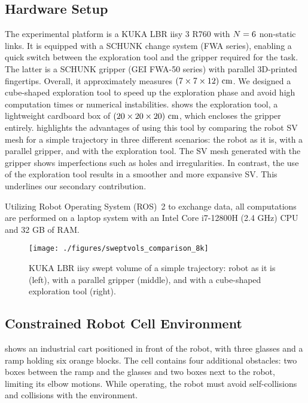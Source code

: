 \subsection{Hardware Setup}
The experimental platform is a KUKA LBR iisy 3 R760 with ${N}=6$ non-static links.
It is equipped with a SCHUNK change system (FWA series), 
enabling a quick switch between the exploration tool and the gripper required for the task.
The latter is a SCHUNK gripper (GEI FWA-50 series) with parallel 3D-printed fingertips.  Overall, it approximately measures ${\left( 7 \times 7 \times 12 \right)\,\text{cm}}$.
We designed a cube-shaped exploration tool to speed up the exploration phase 
and avoid high computation times or numerical instabilities. 
 shows the exploration tool, 
a lightweight cardboard box of ${\left( 20 \times 20 \times 20 \right)\,\text{cm}}$, which encloses the gripper entirely.
 highlights the advantages of using this tool
by comparing the robot SV mesh for a simple trajectory in three different scenarios: 
the robot as it is, 
with a parallel gripper, 
and with the exploration tool.
The SV mesh generated with the gripper shows imperfections such as holes and irregularities. 
In contrast, 
the use of the exploration tool results in a smoother and more expansive SV.
This underlines our secondary contribution.

Utilizing Robot Operating System (ROS)~2 %
to exchange data,
all computations are performed on a laptop system with an Intel Core i7-12800H (2.4 GHz) CPU and 32 GB of RAM.

\begin{figure}[!t]
	\centering
	\texttt{[image: ./figures/sweptvols\_comparison\_8k]}
	\caption{KUKA LBR iisy swept volume of a simple trajectory: 
			 robot as it is (left), 
			 with a parallel gripper (middle), 
			 and with a cube-shaped exploration tool (right).}
	\label{fig:sweptvols_comparison}
\end{figure}

\subsection{Constrained Robot Cell Environment}
 shows an industrial cart positioned in front of the robot,
with three glasses and a ramp holding six orange blocks. 
The cell contains four additional obstacles: 
two boxes between the ramp and the glasses and two boxes next to the robot, 
limiting its elbow motions. 
While operating, 
the robot must avoid self-collisions and collisions with the environment.

